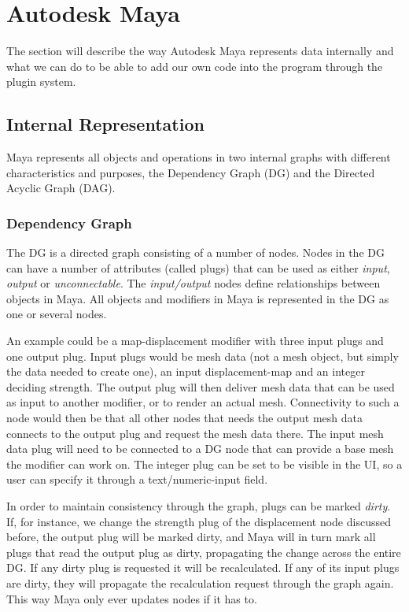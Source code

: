 \section{Autodesk Maya}
\label{sec:Maya}
The section will describe the way Autodesk Maya represents data internally and
what we can do to be able to add our own code into the program through the
plugin system.

\subsection{Internal Representation}
Maya represents all objects and operations in two internal graphs with different
characteristics and purposes, the Dependency Graph (DG) and
the Directed Acyclic Graph (DAG).

\subsubsection{Dependency Graph}

The DG is a directed graph consisting of a number of nodes. Nodes in the DG can
have a number of attributes (called plugs) that can be used as either
\textit{input}, \textit{output} or \textit{unconnectable}. The
\textit{input/output} nodes define relationships between objects in Maya. All
objects and modifiers in Maya is represented in the DG as one or several nodes.

An example could be a map-displacement modifier with three input plugs and one
output plug. Input plugs would be mesh data (not a mesh object, but simply the
data needed to create one), an input displacement-map and an integer deciding
strength. The output plug will then deliver mesh data that can be used as input
to another modifier, or to render an actual mesh. Connectivity to such a node
would then be that all other nodes that needs the output mesh data connects to
the output plug and request the mesh data there. The input mesh data plug will
need to be connected to a DG node that can provide a base mesh the modifier can
work on. The integer plug can be set to be visible in the UI, so a user can
specify it through a text/numeric-input field.

In order to maintain consistency through the graph, plugs can be marked
\textit{dirty}. If, for instance, we change the strength plug of the displacement
node discussed before, the output plug will be marked dirty, and Maya will in
turn mark all plugs that read the output plug as dirty, propagating the change
across the entire DG. If any dirty plug is requested it will be recalculated. If
any of its input plugs are dirty, they will propagate the recalculation request
through the graph again. This way Maya only ever updates nodes if it has to.

